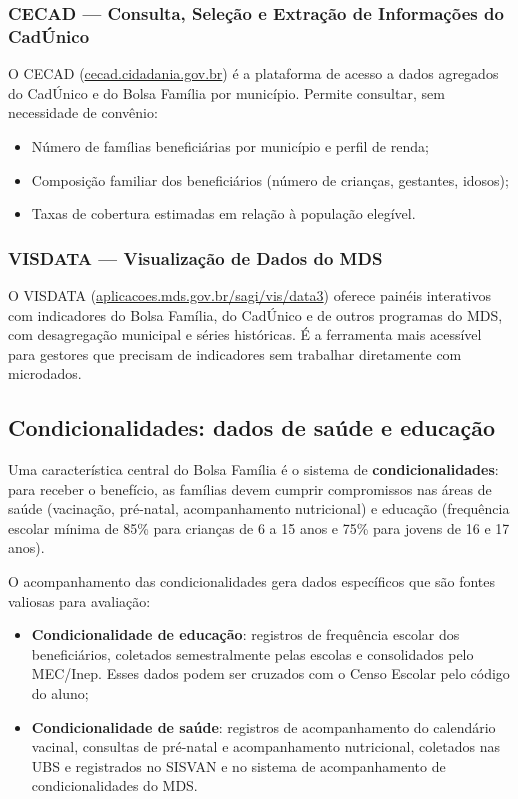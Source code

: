 \subsubsection{CECAD — Consulta, Seleção e Extração de Informações do CadÚnico}

O CECAD (\url{cecad.cidadania.gov.br}) é a plataforma de acesso a dados agregados do CadÚnico e do Bolsa Família por município. Permite consultar, sem necessidade de convênio:

\begin{itemize}
  \item Número de famílias beneficiárias por município e perfil de renda;
  \item Composição familiar dos beneficiários (número de crianças, gestantes, idosos);
  \item Taxas de cobertura estimadas em relação à população elegível.
\end{itemize}

\subsubsection{VISDATA — Visualização de Dados do MDS}

O VISDATA (\url{aplicacoes.mds.gov.br/sagi/vis/data3}) oferece painéis interativos com indicadores do Bolsa Família, do CadÚnico e de outros programas do MDS, com desagregação municipal e séries históricas. É a ferramenta mais acessível para gestores que precisam de indicadores sem trabalhar diretamente com microdados.

\subsection{Condicionalidades: dados de saúde e educação}

Uma característica central do Bolsa Família é o sistema de \textbf{condicionalidades}: para receber o benefício, as famílias devem cumprir compromissos nas áreas de saúde (vacinação, pré-natal, acompanhamento nutricional) e educação (frequência escolar mínima de 85\% para crianças de 6 a 15 anos e 75\% para jovens de 16 e 17 anos).

O acompanhamento das condicionalidades gera dados específicos que são fontes valiosas para avaliação:

\begin{itemize}
  \item \textbf{Condicionalidade de educação}: registros de frequência escolar dos beneficiários, coletados semestralmente pelas escolas e consolidados pelo MEC/Inep. Esses dados podem ser cruzados com o Censo Escolar pelo código do aluno;
  \item \textbf{Condicionalidade de saúde}: registros de acompanhamento do calendário vacinal, consultas de pré-natal e acompanhamento nutricional, coletados nas UBS e registrados no SISVAN e no sistema de acompanhamento de condicionalidades do MDS.
\end{itemize}

